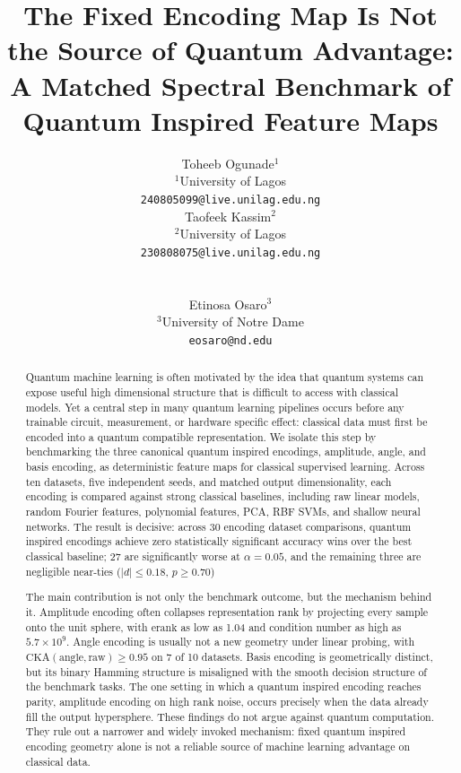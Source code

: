 \documentclass[12pt]{article}
\title{%
  \textbf{The Fixed Encoding Map Is Not the Source of Quantum Advantage:
  A Matched Spectral Benchmark of Quantum Inspired Feature Maps}%
}
\author{%
  \begin{minipage}[t]{0.45\textwidth}
    \centering
    Toheeb Ogunade$^1$\\
    \small $^1$University of Lagos\\
    \small\texttt{240805099@live.unilag.edu.ng}
  \end{minipage}%
  \hfill%
  \begin{minipage}[t]{0.45\textwidth}
    \centering
    Taofeek Kassim$^2$\\
    \small $^2$University of Lagos\\
    \small\texttt{230808075@live.unilag.edu.ng}
  \end{minipage}\\[3em]
  \begin{minipage}[t]{\textwidth}
    \centering
    Etinosa Osaro$^3$\\
    \small $^3$University of Notre Dame\\
    \small\texttt{eosaro@nd.edu}
  \end{minipage}%
}
\date{}
\newcommand{\erank}{\mathrm{erank}}
\begin{document}
\maketitle

\begin{abstract}

Quantum machine learning is often motivated by the idea that quantum systems
can expose useful high dimensional structure that is difficult to access with
classical models. Yet a central step in many quantum learning pipelines occurs
before any trainable circuit, measurement, or hardware specific effect:
classical data must first be encoded into a quantum compatible representation.
We isolate this step by benchmarking the three canonical quantum inspired
encodings, amplitude, angle, and basis encoding, as deterministic feature maps
for classical supervised learning. Across ten datasets, five independent seeds,
and matched output dimensionality, each encoding is compared against strong
classical baselines, including raw linear models, random Fourier features,
polynomial features, PCA, RBF SVMs, and shallow neural networks. The result is
decisive: across 30 encoding dataset comparisons, quantum inspired encodings
achieve zero statistically significant accuracy wins over the best classical
baseline; 27 are significantly worse at $\alpha=0.05$, and the remaining three are negligible near-ties ($|d|\leq0.18$, $p\geq0.70$)

The main contribution is not only the benchmark outcome, but the mechanism
behind it. Amplitude encoding often collapses representation rank by projecting
every sample onto the unit sphere, with $\erank$ as low as 1.04 and condition
number as high as $5.7\times10^9$. Angle encoding is usually not a new geometry
under linear probing, with $\mathrm{CKA}(\mathrm{angle},\mathrm{raw})\geq0.95$
on 7 of 10 datasets. Basis encoding is geometrically distinct, but its binary
Hamming structure is misaligned with the smooth decision structure of the
benchmark tasks. The one setting in which a quantum inspired encoding reaches
parity, amplitude encoding on high rank noise, occurs precisely when the data
already fill the output hypersphere. These findings do not argue against
quantum computation. They rule out a narrower and widely invoked mechanism:
fixed quantum inspired encoding geometry alone is not a reliable source of
machine learning advantage on classical data.

\end{abstract}
\end{document}
